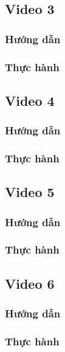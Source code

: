 \documentclass{article}
\begin{document}
\subsection{Video 3}
\subsubsection{Hướng dẫn}

\subsubsection{Thực hành}




\subsection{Video 4}
\subsubsection{Hướng dẫn}

\subsubsection{Thực hành}




\subsection{Video 5}
\subsubsection{Hướng dẫn}

\subsubsection{Thực hành}




\subsection{Video 6}
\subsubsection{Hướng dẫn}

\subsubsection{Thực hành}
\end{document}
